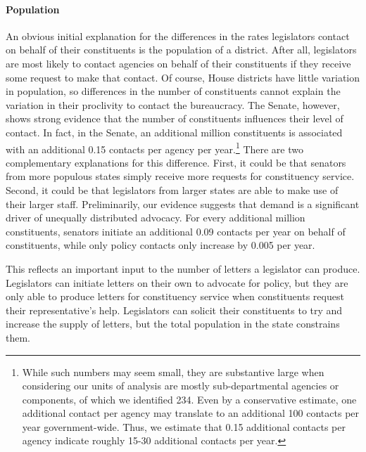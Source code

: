\documentclass{article}
\begin{document}
\paragraph{Population} An obvious initial explanation for the differences in the rates legislators contact on behalf of their constituents is the population of a district.  After all, legislators are most likely to contact agencies on behalf of their constituents if they receive some request to make that contact.  Of course, House districts have little variation in population, so differences in the number of constituents cannot explain the variation in their proclivity to contact the bureaucracy.  The Senate, however, shows strong evidence that the number of constituents influences their level of contact.  In fact, in the Senate, an additional million constituents is associated with an additional 0.15 contacts per agency per year.\footnote{While such numbers may seem small, they are substantive large when considering our units of analysis are mostly sub-departmental agencies or components, of which we identified 234. Even by a conservative estimate, one additional contact per agency may translate to an additional 100 contacts per year government-wide. Thus, we estimate that 0.15 additional contacts per agency indicate roughly 15-30 additional contacts per year.} There are two complementary explanations for this difference. First, it could be that senators from more populous states simply receive more requests for constituency service.  Second, it could be that legislators from larger states are able to make use of their larger staff.  Preliminarily, our evidence suggests that demand is a significant driver of unequally distributed advocacy. For every additional million constituents, senators initiate an additional 0.09 contacts per year on behalf of constituents, while only policy contacts only increase by 0.005 per year.  

 This reflects an important input to the number of letters a legislator can produce.  Legislators can initiate letters on their own to advocate for policy, but they are only able to produce letters for constituency service when constituents request their representative's help.  Legislators can solicit their constituents to try and increase the supply of letters, but the total population in the state constrains them.   

\end{document}
